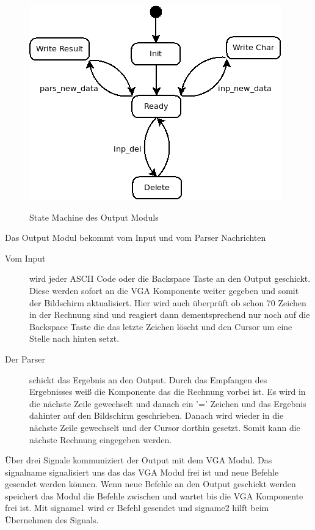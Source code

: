 \begin{figure}[!ht]
 \caption{State Machine des Output Moduls}
 \centering
 \includegraphics[scale=0.55]{pics/Output.png}
 \label{fig:output_module}
\end{figure}

Das Output Modul bekommt vom Input und vom Parser Nachrichten\\
\begin{description}
 \item[Vom Input] wird jeder ASCII Code oder die Backspace Taste an den Output geschickt. Diese werden
sofort an die VGA Komponente weiter gegeben und somit der Bildschirm aktualisiert. Hier wird auch überprüft ob
schon 70 Zeichen in der Rechnung sind und reagiert dann dementsprechend nur noch auf die Backspace Taste die das letzte Zeichen
löscht und den Cursor um eine Stelle nach hinten setzt.\\
 \item[Der Parser] schickt das Ergebnis an den Output. Durch das Empfangen des Ergebnisses weiß die Komponente
das die Rechnung vorbei ist. Es wird in die nächste Zeile gewechselt und danach ein '=' Zeichen und das Ergebnis
dahinter auf den Bildschirm geschrieben. Danach wird wieder in die nächste Zeile gewechselt und der Cursor dorthin
gesetzt. Somit kann die nächste Rechnung eingegeben werden.
 \end{description}
Über drei Signale kommuniziert der Output mit dem VGA Modul. Das signalname signalisiert uns das das VGA Modul 
frei ist und neue Befehle gesendet werden können. Wenn neue Befehle an den Output geschickt werden speichert das
Modul die Befehle zwischen und wartet bis die VGA Komponente frei ist. Mit signame1 wird er Befehl
gesendet und signame2 hilft beim Übernehmen des Signals.


